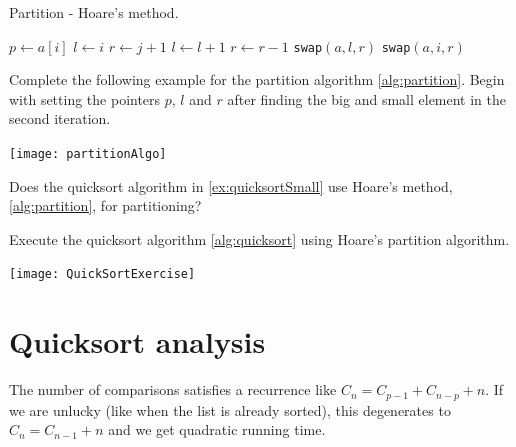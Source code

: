 \begin{algorithm}[H]
  \caption{Partition - Hoare's method.}
    \label{alg:partition}
\begin{algorithmic}[0]
	\State $p \gets a[i]$ 
	\State $l \gets i $ 
	\State $r \gets j+1$ 
		\Repeat
			\State $l \gets l+1$ 
		\Repeat
			\State $r \gets r-1$ 
			\State \texttt{swap}$(a,l,r)$  
		\Else
			\State \texttt{swap}$(a,i,r)$  
			\State {}
		\EndIf
	\EndWhile
\EndFunction  
\end{algorithmic}
\end{algorithm}


\begin{Boxample}[0]
Complete the following example for the partition algorithm \cref{alg:partition}. 
Begin with setting the pointers $p$, $l$ and $r$ after finding the big and small element in the second iteration.
\begin{center}
\texttt{[image: partitionAlgo]}
\end{center}
\end{Boxample}

\begin{Boxample}[1]
Does the quicksort algorithm in \cref{ex:quicksortSmall} use Hoare's method, \cref{alg:partition}, for partitioning? 
\end{Boxample}


\begin{Boxample}[2]
Execute the quicksort algorithm \cref{alg:quicksort} using Hoare's partition algorithm.
\begin{center}
\texttt{[image: QuickSortExercise]}
\end{center}
\end{Boxample}

\section{Quicksort analysis}
The number of comparisons satisfies a recurrence like 
$C_n = C_{p-1} + C_{n - p} + n$. If we are unlucky (like when the list is already sorted), this degenerates to 
$C_{n} = C_{n-1} + n$ and we get quadratic running time.

